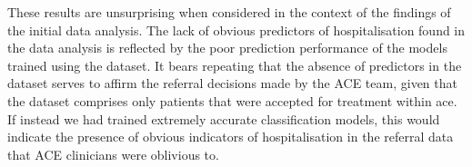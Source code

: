 These results are unsurprising when considered in the context of the findings of the initial data analysis. The lack of obvious predictors of hospitalisation found in the data analysis is reflected by the poor prediction performance of the models trained using the dataset. It bears repeating that the absence of predictors in the dataset serves to affirm the referral decisions made by the ACE team, given that the dataset comprises only patients that were accepted for treatment within ace. If instead we had trained extremely accurate classification models, this would indicate the presence of obvious indicators of hospitalisation in the referral data that ACE clinicians were oblivious to.